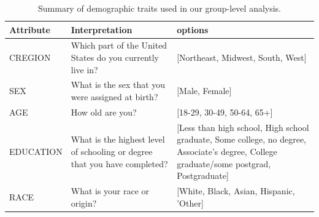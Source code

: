 \begin{table}

   \caption{Summary of demographic traits used in our group-level analysis.}
   \label{tab:survey_md}
   \vskip 0.15in
   \renewcommand{\arraystretch}{1.5}
   \begin{center}
   \begin{small}
   
    \begin{tabular}{lp{5cm}p{8cm}}
        \toprule
        Attribute &                                                                       Interpretation &                                                                                                                                                                                                                                                           options \\
     \midrule
         CREGION &                     Which part of the United States do you currently live in? &                                                                                                                                                                                                                                 [Northeast, Midwest, South, West] \\
          SEX &              What is the sex that you were assigned at birth? &                                                                                                                                                                                                                      [Male, Female] \\
             AGE &                                                              How old are you? &                                                                                                                                                                                                                               [18-29, 30-49, 50-64, 65+] \\
       EDUCATION &     What is the highest level of schooling or degree that you have completed? &                                                                                                                [Less than high school, High school graduate, Some college, no degree, Associate's degree, College graduate/some postgrad, Postgraduate] \\
            RACE &                                                  What is your race or origin? &                                                                                                                                                              [White, Black, Asian, Hispanic, 'Other] \\

\end{tabular}
\end{small}
\end{center}
\end{table}
